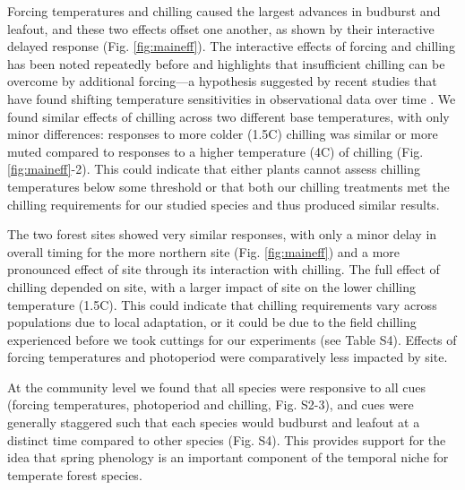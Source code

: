 \documentclass[11pt]{article}
\begin{document}
Forcing temperatures and chilling caused the largest advances in budburst and leafout, and these two effects offset one another, as shown by their interactive delayed response (Fig. \ref{fig:maineff}). The interactive effects of forcing and chilling has been noted repeatedly before \citep[e.g.,][]{Heide:1993b,Caffarra:2011aa} and highlights that insufficient chilling can be overcome by additional forcing---a hypothesis suggested by recent studies that have found shifting temperature sensitivities in observational data over time \citep{yu2010,fu2015}. We found similar effects of chilling across two different base temperatures, with only minor differences: responses to more colder (1.5\degree C) chilling was similar or more muted compared to responses to a higher temperature (4\degree C) of chilling (Fig. \ref{fig:maineff}-2). This could indicate that either plants cannot assess chilling temperatures below some threshold \citep{guy2014,Harrington:2010} or that both our chilling treatments met the chilling requirements for our studied species and thus produced similar results. 

The two forest sites showed very similar responses, with only a minor delay in overall timing for the more northern site (Fig. \ref{fig:maineff}) and a more pronounced effect of site through its interaction with chilling. The full effect of chilling depended on site, with a larger impact of site on the lower chilling temperature (1.5\degree C). This could indicate that chilling requirements vary across populations due to local adaptation, or it could be due to the field chilling experienced before we took cuttings for our experiments (see Table S4). Effects of forcing temperatures and photoperiod were comparatively less impacted by site. 

At the community level we found that all species were responsive to all cues (forcing temperatures, photoperiod and chilling, Fig. S2-3), and cues were generally staggered such that each species would budburst and leafout at a distinct time compared to other species (Fig. S4). This provides support for the idea that spring phenology is an important component of the temporal niche \citep{gotelli1996,Loreau:2008xy} for temperate forest species.
\end{document}
